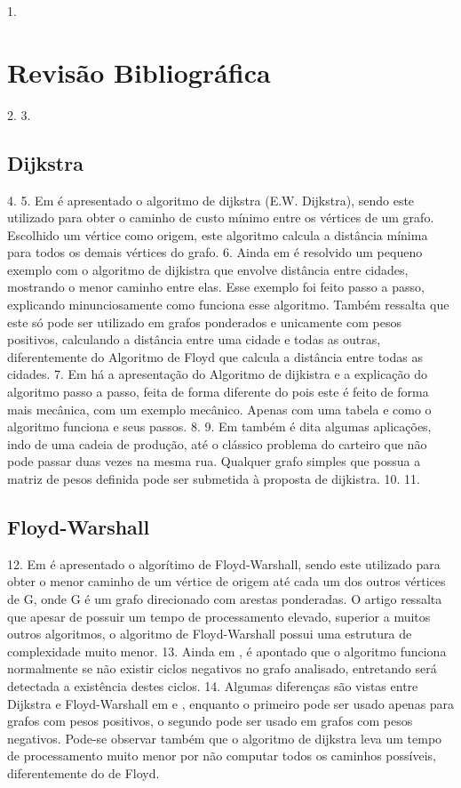 1.	\chapter{Revisão Bibliográfica}
2.	 
3.	\section{Dijkstra}
4.	 
5.	    Em \cite{de2008algoritmo} é apresentado o algoritmo de dijkstra (E.W. Dijkstra), sendo este utilizado para obter o caminho de custo mínimo entre os vértices de um grafo. Escolhido um vértice como origem, este algoritmo calcula a distância mínima para todos os demais vértices do grafo.   
6.	    Ainda em \cite{de2008algoritmo} é resolvido um pequeno exemplo com o algoritmo de dijkistra que envolve distância entre cidades, mostrando o menor caminho entre elas. Esse exemplo foi feito passo a passo, explicando minunciosamente como funciona esse algoritmo. Também ressalta que este só pode ser utilizado em grafos ponderados e unicamente com pesos positivos, calculando a distância entre uma cidade e todas as outras, diferentemente do Algoritmo de Floyd que calcula a distância entre todas as cidades.   
7.	    Em \cite{barros2007algoritmo} há a apresentação do Algoritmo de dijkistra e a explicação do algoritmo passo a passo, feita de forma diferente do \cite{algo} pois este é feito de forma mais mecânica, com um exemplo mecânico. Apenas com uma tabela e como o algoritmo funciona e seus passos.
8.	   
9.	    Em \cite{barros2007algoritmo} também é dita algumas aplicações, indo de uma cadeia de produção, até o clássico problema do carteiro que não pode passar duas vezes na mesma rua. Qualquer grafo simples que possua a matriz de pesos definida pode ser submetida à proposta de dijkistra.
10.	   
11.	\section{Floyd-Warshall} 
12.	    Em \cite{hougard2010floyd} é apresentado o algorítimo de Floyd-Warshall, sendo este utilizado para obter o menor caminho de um vértice de origem até cada um dos outros vértices de  G, onde G é um grafo direcionado com arestas ponderadas. O artigo ressalta que apesar de possuir um tempo de processamento elevado, superior a muitos outros algoritmos, o algoritmo de Floyd-Warshall possui uma estrutura de complexidade muito menor.
13.	    Ainda em \cite{hougard2010floyd}, é apontado que o algoritmo funciona normalmente se não existir ciclos negativos no grafo analisado, entretando será detectada a existência destes ciclos. 
14.	   Algumas diferenças são vistas entre Dijkstra e Floyd-Warshall em \cite{barros2007algoritmo} e \cite{hougard2010floyd}, enquanto o primeiro pode ser usado apenas para grafos com pesos positivos, o segundo pode ser usado em grafos com pesos negativos. Pode-se observar também que o algoritmo de dijkstra leva um tempo de processamento muito menor por não computar todos os caminhos possíveis, diferentemente do de Floyd. 
